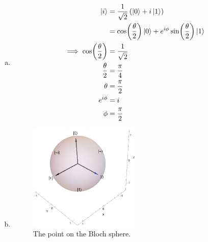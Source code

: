 \documentclass[12pt]{extarticle}
\begin{document}
\begin{enumerate}[(a)]
\item
\begin{align*}
\ket{i} & = \frac{1}{\sqrt{2}}\left(\ket{0}+i\ket{1}\right) \\
& = \cos(\frac{\theta}{2})\ket{0} + e^{i\phi}\sin(\frac{\theta}{2})\ket{1} \\
\implies \cos(\frac{\theta}{2}) & = \frac{1}{\sqrt{2}} \\
\frac{\theta}{2} & = \frac{\pi}{4} \\
\theta & = \frac{\pi}{2} \\
e^{i\phi} & = i \\
\phi & = \frac{\pi}{2}
\end{align*}
\item
\begin{figure}[h]
\centering
\includegraphics[width=0.5\textwidth]{Exercise2.14-Bloch.eps}
\caption{The point on the Bloch sphere.}
\label{fig:bloch_sphere2.14}
\end{figure}
\end{enumerate}

\end{document}
